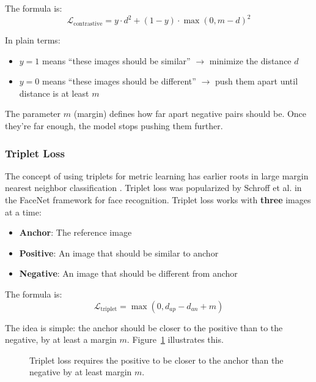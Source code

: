 \documentclass[
    english,
]{VUMIFPSbakalaurinis}
\begin{document}
The formula \cite{Che20} is:
\begin{equation}
\mathcal{L}_{\text{contrastive}} = y \cdot d^2 + (1-y) \cdot \max(0, m - d)^2
\label{eq:contrastive}
\end{equation}

In plain terms:
\begin{itemize}
    \item $y = 1$ means \enquote{these images should be similar} $\rightarrow$ minimize the distance $d$
    \item $y = 0$ means \enquote{these images should be different} $\rightarrow$ push them apart until distance is at least $m$
\end{itemize}

The parameter $m$ (margin) defines how far apart negative pairs should be. Once they're far enough, the model stops pushing them further.

\subsubsection{Triplet Loss}

The concept of using triplets for metric learning has earlier roots in large margin nearest neighbor classification \cite{Wei06}. Triplet loss was popularized by Schroff et al. \cite{Sch15} in the FaceNet framework for face recognition. Triplet loss works with \textbf{three} images at a time:
\begin{itemize}
    \item \textbf{Anchor}: The reference image
    \item \textbf{Positive}: An image that should be similar to anchor
    \item \textbf{Negative}: An image that should be different from anchor
\end{itemize}

The formula \cite{Sch15} is:
\begin{equation}
\mathcal{L}_{\text{triplet}} = \max(0, d_{ap} - d_{an} + m)
\label{eq:triplet}
\end{equation}

The idea is simple: the anchor should be closer to the positive than to the negative, by at least a margin $m$. Figure~\ref{fig:triplet} illustrates this.

\begin{figure}[H]
\centering
{}
\caption{Triplet loss requires the positive to be closer to the anchor than the negative by at least margin $m$.}
\label{fig:triplet}
\end{figure}
\end{document}
